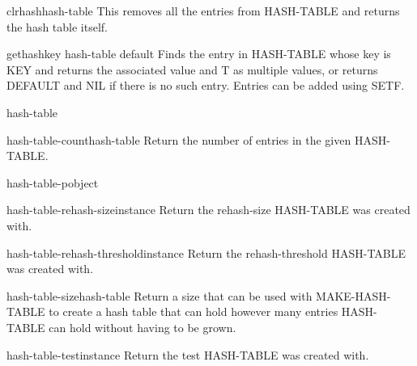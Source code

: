\begin{function}{clrhash}{hash-table}{}
  This removes all the entries from HASH-TABLE and returns the hash
table itself.
\end{function}

\begin{accessor}{gethash}{key hash-table \op default}{}
  Finds the entry in HASH-TABLE whose key is KEY and returns the
associated value and T as multiple values, or returns DEFAULT and NIL
if there is no such entry. Entries can be added using SETF.
\end{accessor}

\begin{class}{hash-table}{}{}
  
\end{class}

\begin{function}{hash-table-count}{hash-table}{}
  Return the number of entries in the given HASH-TABLE.
\end{function}

\begin{function}{hash-table-p}{object}{}
  
\end{function}

\begin{function}{hash-table-rehash-size}{instance}{}
  Return the rehash-size HASH-TABLE was created with.
\end{function}

\begin{function}{hash-table-rehash-threshold}{instance}{}
  Return the rehash-threshold HASH-TABLE was created with.
\end{function}

\begin{function}{hash-table-size}{hash-table}{}
  Return a size that can be used with MAKE-HASH-TABLE to create a hash
   table that can hold however many entries HASH-TABLE can hold without
   having to be grown.
\end{function}

\begin{function}{hash-table-test}{instance}{}
  Return the test HASH-TABLE was created with.
\end{function}

